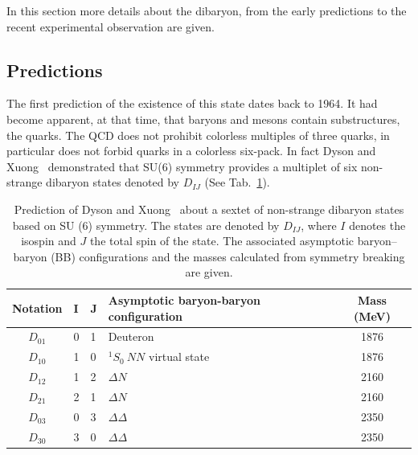 In this section more details about the \ds dibaryon, from the early predictions to the 
recent experimental observation are given.

%
\subsection{Predictions} \label{sec:2.2.1}

The first prediction of the existence of this state dates back to 1964. 
It had become apparent, at that time, that baryons and mesons contain substructures, the quarks.
The QCD does not prohibit colorless multiples of three quarks, in particular does not forbid 
quarks in a colorless six-pack. In fact Dyson and Xuong~\cite{dysonxuong} demonstrated that SU(6)
symmetry provides a multiplet of six non-strange dibaryon states denoted by $D_{IJ}$ 
(See Tab.~\ref{tab:dibaryons}).

\begingroup
\renewcommand{\arraystretch}{1.2} %
\begin{table} [htb]
\centering
\begin{tabularx}{\textwidth}{cXXlc}
\toprule
\textbf{Notation}    &   \textbf{I}   &   \textbf{J}   &   \textbf{Asymptotic baryon-baryon configuration}            &\textbf{Mass (MeV)} \\
\midrule
$D_{01}$    &   0   &   1   &   \qquad \qquad Deuteron                            &   1876    \\
$D_{10}$    &   1   &   0   &   \qquad \qquad $^{1}S_{0}\ NN$ virtual state       &   1876    \\ 
$D_{12}$    &   1   &   2   &   \qquad \qquad $\Delta N$                          &   2160    \\
$D_{21}$    &   2   &   1   &   \qquad \qquad $\Delta N$                          &   2160    \\
$D_{03}$    &   0   &   3   &   \qquad \qquad $\Delta \Delta$                     &   2350    \\
$D_{30}$    &   3   &   0   &   \qquad \qquad $\Delta \Delta$                     &   2350    \\
\bottomrule
\end{tabularx}
\caption{Prediction of Dyson and Xuong~\cite{dysonxuong} about a sextet of non-strange dibaryon states based on SU (6) symmetry. The states are denoted by $D_{IJ}$, where $I$ denotes the isospin and $J$ the total spin of the state. The associated asymptotic baryon–baryon (BB) configurations and the masses calculated from symmetry breaking are given.}
\label{tab:dibaryons}
\end{table}
\endgroup

